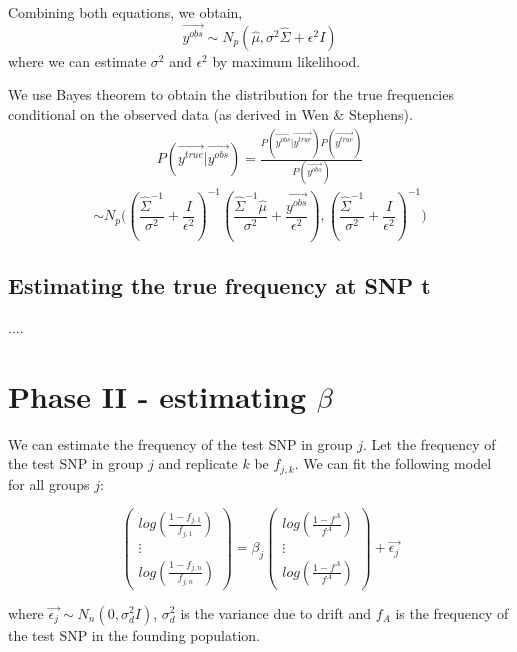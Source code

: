 \documentclass[10pt,a4paper,draft]{article}
\begin{document}
Combining both equations, we obtain,
\begin{equation}
 \vec{y^{obs}} \sim N_p(\hat{\mu}, \sigma^2\hat{\Sigma} + \epsilon^2I)
\end{equation}
where we can estimate $\sigma^2$ and $\epsilon^2$ by maximum likelihood.

We use Bayes theorem to obtain the distribution for the true frequencies conditional on the observed data (as derived in Wen \& Stephens).
\begin{align*}
P(\vec{y^{true}} | \vec{y^{obs}}) = \frac{P(\vec{y^{obs}} | \vec{y^{true}}) P(\vec{y^{true}})}{P(\vec{y^{obs}})} 
\end{align*}
\begin{equation}
\sim N_p\Big((\frac{\hat{\Sigma}^{-1}}{\sigma^2} + \frac{I}{\epsilon^2})^{-1}(\frac{\hat{\Sigma}^{-1}\hat{\mu}}{\sigma^2} + \frac{\vec{y^{obs}}}{\epsilon^2}), (\frac{\hat{\Sigma}^{-1}}{\sigma^2} + \frac{I}{\epsilon^2})^{-1}\Big)\label{likl}
\end{equation}

\subsection{Estimating the true frequency at SNP t}
....

\section{Phase II - estimating $\beta$}
We can estimate the frequency of the test SNP in group $j$. Let the frequency of the test SNP in group $j$ and replicate $k$ be $f_{j,k}$. We can fit the following model for all groups $j$:

\[
\left(\begin{array}{c}
log(\frac{1-f_{j,1}}{f_{j,1}}) \\
\vdots \\
log(\frac{1-f_{j,n}}{f_{j,n}})
\end{array}\right)
= \beta_j
\left(\begin{array}{c}
log(\frac{1-f^A}{f^A}) \\
\vdots \\
log(\frac{1-f^A}{f^A})
\end{array}\right) + \vec{\epsilon_j}
\]

where $\vec{\epsilon_j} \sim N_n(0, \sigma_{d}^2I)$, $\sigma_d^2$ is the variance due to drift and $f_A$ is the frequency of the test SNP in the founding population.
\end{document}
